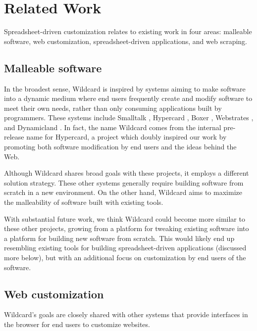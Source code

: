 \documentclass[english]{programming}
\begin{document}
\hypertarget{sec:related-work}{%
\section{Related Work}\label{sec:related-work}}

Spreadsheet-driven customization relates to existing work in four areas:
malleable software, web customization, spreadsheet-driven applications,
and web scraping.

\hypertarget{malleable-software}{%
\subsection{Malleable software}\label{malleable-software}}

In the broadest sense, Wildcard is inspired by systems aiming to make
software into a dynamic medium where end users frequently create and
modify software to meet their own needs, rather than only consuming
applications built by programmers. These systems include Smalltalk
\autocite{kay1977}, Hypercard \autocite{hypercard2019}, Boxer
\autocite{disessa1986}, Webstrates \autocite{klokmose2015}, and
Dynamicland \autocite{victor}. In fact, the name Wildcard comes from the
internal pre-release name for Hypercard, a project which doubly inspired
our work by promoting both software modification by end users and the
ideas behind the Web.

Although Wildcard shares broad goals with these projects, it employs a
different solution strategy. These other systems generally require
building software from scratch in a new environment. On the other hand,
Wildcard aims to maximize the malleability of software built with
existing tools.

With substantial future work, we think Wildcard could become more
similar to these other projects, growing from a platform for tweaking
existing software into a platform for building new software from
scratch. This would likely end up resembling existing tools for building
spreadsheet-driven applications (discussed more below), but with an
additional focus on customization by end users of the software.

\hypertarget{web-customization}{%
\subsection{Web customization}\label{web-customization}}

Wildcard's goals are closely shared with other systems that provide
interfaces in the browser for end users to customize websites.
\end{document}

